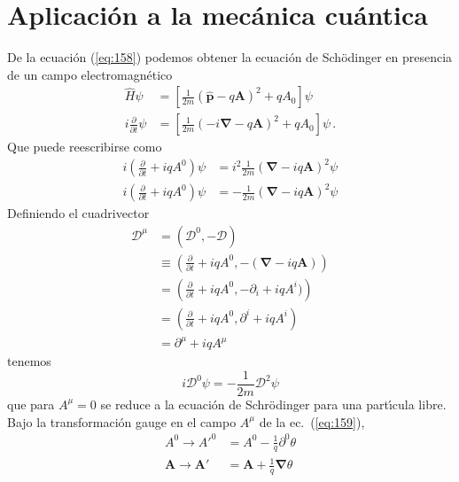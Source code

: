 \section{Aplicaci\'on a la mec\'anica cu\'antica}
\label{sec:aplic-la-mecan}
De la ecuaci\'on (\ref{eq:158}) podemos obtener la ecuaci\'on de Sch\"odinger en presencia de un campo electromagn\'etico
\begin{align}
    \widehat{H}\psi&=\left[\frac{1}{2m}(\hat{\mathbf{p}}-q\mathbf{A})^2+qA_0\right]\psi\nonumber\\
i\frac{\partial}{\partial t}\psi&=\left[\frac{1}{2m}(-i\mathbf{\nabla}-q\mathbf{A})^2+qA_0\right]\psi\,.
\end{align}
Que puede reescribirse como
\begin{align}
  i\left(\frac{\partial}{\partial t}+iqA^0\right)\psi&=i^2\frac{1}{2m}(\mathbf{\nabla}-iq\mathbf{A})^2\psi\nonumber\\
  i\left(\frac{\partial}{\partial t}+iqA^0\right)\psi&=-\frac{1}{2m}(\mathbf{\nabla}-iq\mathbf{A})^2\psi
\end{align}
Definiendo el cuadrivector
\begin{align}
  \mathcal{D}^\mu&=(\mathcal{D}^0,-\boldsymbol{\mathcal{D}})\nonumber\\
  &\equiv\left(\frac{\partial}{\partial t}+iqA^0,-(\mathbf{\nabla}-iq\mathbf{A})\right)\nonumber\\
  &=\left(\frac{\partial}{\partial t}+iqA^0,-\partial_i+iqA^i)\right)\nonumber\\
  &=\left(\frac{\partial}{\partial t}+iqA^0,\partial^i+iqA^i\right)\nonumber\\
  &=\partial^\mu+iqA^\mu
\end{align}
tenemos
\begin{equation}
  \label{eq:161}
  i\mathcal{D}^0\psi=-\frac{1}{2m}\boldsymbol{\mathcal{D}}^2\psi
\end{equation}
que para $A^\mu=0$ se reduce a la ecuaci\'on de Schr\"odinger para una part\'\i cula libre. 
Bajo la transformaci\'on gauge en el campo $A^\mu$ de la ec.~(\ref{eq:159}),
\begin{align}
  A^0\to {A'}^0&=A^0-\frac{1}{q}\partial^0\theta\nonumber\\
  \mathbf{A}\to \mathbf{A}'&=\mathbf{A}+\frac{1}{q}\boldsymbol{\nabla}\theta
\end{align}

